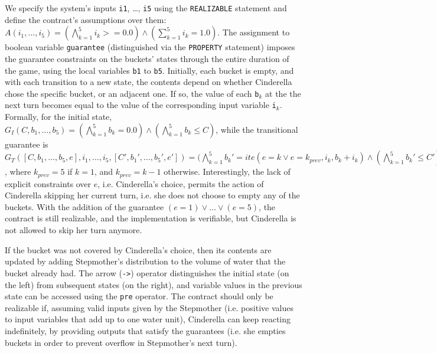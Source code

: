 We specify the system's inputs \texttt{i1}, \ldots, \texttt{i5} using the \texttt{REALIZABLE} statement and define the contract's assumptions over them: $A(i_1, \ldots, i_5) = (\bigwedge_{k=1}^{5} i_k >= 0.0) \land (\sum_{k=1}^{5} i_{k} = 1.0)$. The assignment to boolean variable \texttt{guarantee} (distinguished via the \texttt{PROPERTY} statement) imposes the guarantee constraints on the buckets' states through the entire
duration of the game, using the local variables \texttt{b1} to \texttt{b5}.
Initially, each bucket is empty, and with each transition to a new state, the contents depend on
whether Cinderella chose the specific bucket, or an adjacent one. If so, the value of each \texttt{b}$_k$ at the the next turn becomes equal to the value of the corresponding input variable \texttt{i}$_k$. Formally, for the initial state, $G_{I}(C, b_1, \ldots, b_5) = (\bigwedge_{k=1}^{5} b_k = 0.0) \land (\bigwedge_{k = 1}^{5} b_k \le C)$, while the transitional guarantee is $G_T([C,b_1, \ldots, b_5, e], i_1, \ldots, i_5, [C',b_{1}', \ldots, b_{5}',e']) = (\bigwedge_{k=1}^{5} b_{k}' = ite(e = k \lor e = k_{prev}, i_k, b_k + i_k) \land (\bigwedge_{k=1}^{5} b_{k}' \le C')$, where $k_{prev} = 5$ if $k = 1$, and $k_{prev} = k - 1$ otherwise. Interestingly, the lack of explicit constraints over $e$, i.e. Cinderella's choice, permits the action of Cinderella skipping her current turn, i.e. she does not choose to empty any of the buckets. With the addition of the guarantee $(e = 1) \lor \ldots \lor (e =5)$, the contract is still realizable, and the implementation is verifiable, but Cinderella is not allowed to skip her turn anymore.

If the bucket was not covered by Cinderella's choice, then its contents are
updated by adding Stepmother's distribution to the volume of water that the
bucket already had. The arrow (\texttt{->}) operator distinguishes the initial state (on the left) from subsequent states (on the right), and variable values in the previous state can be accessed using the \texttt{pre} operator.
The contract should only be realizable if, assuming valid inputs given by the Stepmother
(i.e. positive values to input variables that add up to one water unit),
Cinderella can keep reacting indefinitely, by providing outputs that satisfy the
guarantees (i.e. she empties buckets in order to prevent overflow in Stepmother's next turn).


